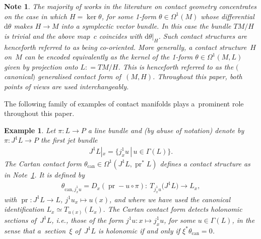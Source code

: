 \documentclass[10pt,a4paper]{amsart}
\numberwithin{equation}{section}
\newtheorem{Note}[Theorem]{Note}
\newtheorem{Example}[Theorem]{Example}
\newcommand{\de}{\mathrm{d}} %
\newcommand{\CM}{(M,H)} %
\begin{document}
\begin{Note}\label{obs:ct_mfs} The majority of works in the literature on contact geometry concentrates on the case in which $H = \ker \theta$, for some 1-form $\theta \in \Omega^1(M)$ whose dif\/ferential $\de \theta$ makes $H \to M$ into a symplectic vector bundle. In this case the bundle $TM/ H$ is trivial and the above map~$c$ coincides with $\de \theta|_H$. Such contact structures are henceforth referred to as being {\em co-oriented}. More generally, a contact structure~$H$ on~$M$ can be encoded equivalently as the kernel of the 1-form $\theta \in \Omega^1(M,L)$ given by projection onto $L: = T M/H$. This is henceforth referred to as the {\it $($canonical$)$ generalised contact form} of~$\CM$. Throughout this paper, both points of views are used interchangeably.
\end{Note}

The following family of examples of contact manifolds plays a~prominent role throughout this paper.

\begin{Example}\label{ex:jet_bundle}
Let $\pi\colon L\to P$ a line bundle and (by abuse of notation) denote by $\pi \colon J^1L\to P$ the {\it first jet bundle}
\begin{gather*} J^1 L|_x=\big\{j^1_xu\,|\, u\in\Gamma(L)\big\}.\end{gather*}
The Cartan contact form $ \theta_{\mathrm{can}}\in\Omega^1(J^1L,\operatorname{pr}^*L)$ def\/ines a contact structure as in Note~\ref{obs:ct_mfs}. It is def\/ined by
\begin{gather*}
 \theta_{\mathrm{can}, j^1_xu}=D_x(\operatorname{pr}-u\circ\pi)\colon \ T_{j^1_xu}\big(J^1L\big)\to L_{x},
\end{gather*}
with $\operatorname{pr}\colon J^1L\to L$, $j^1u_x\mapsto u(x)$, and where we have used the canonical identif\/ication $L_x\simeq T_{u(x)}(L_x).$ The Cartan contact form detects {\it holonomic} sections of~$J^1L$, i.e., those of the form $j^1u\colon x\mapsto j^1_xu$, for some $u\in\Gamma(L)$, in the sense that a~section~$\xi$ of~$J^1L$ is holonomic if and only if $\xi^*\theta_\text{can}=0$.
\end{Example}
\end{document}
